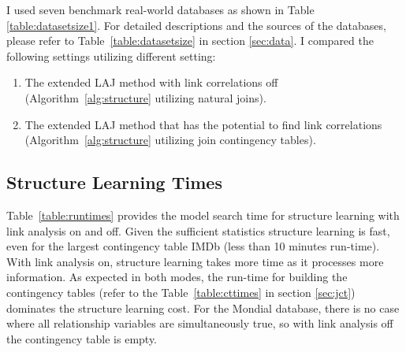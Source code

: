 \documentclass{sfuthesis}
\begin{document}
I  used seven benchmark real-world databases as shown in Table \ref{table:datasetsize1}. For detailed descriptions and  the sources of the databases, please refer to Table~\ref{table:datasetsize} in section \ref{sec:data}. 
I  compared the following settings utilizing different setting: 
\begin{enumerate}
\item The extended LAJ method with link correlations off (Algorithm~\ref{alg:structure} utilizing  natural joins). 
\item The extended LAJ method that has the potential to find link correlations (Algorithm~\ref{alg:structure} utilizing join contingency tables). 
\end{enumerate}
\begin{table}[!h] \centering\caption{Datasets characteristics.\\ \#Tuples = total number of tuples over all tables in the dataset. 
  \label{table:datasetsize1}}
\end{table}



\subsection{Structure Learning Times} 
Table~\ref{table:runtimes} provides the model search time for structure learning with link analysis on and off. Given the sufficient statistics structure learning is fast, even for the largest contingency table  IMDb (less than 10 minutes run-time). With link analysis on, structure learning takes more time as it processes more information. 
As expected in both modes, the run-time for building the contingency tables (refer to the Table~\ref{table:cttimes} in section \ref{sec:jct}) dominates the structure learning cost. For the Mondial database, there is no case where all relationship variables are simultaneously true, so with link analysis off the contingency table is empty.
\end{document}
